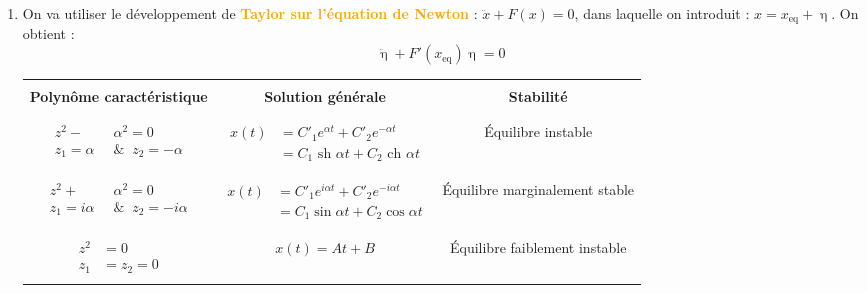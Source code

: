 \documentclass[a4paper]{article}
\begin{document}
\begin{enumerate}
\item On va utiliser le développement de \textcolor{orange}{\textbf{Taylor sur l'équation de Newton}} : $ \ddot{x} + F(x) = 0 $, dans laquelle on introduit : $ x = x_{\text{eq}} + \upeta $. On obtient : \[ \ddot{\upeta} + F'(x_{\text{eq}}) \upeta = 0 \]

\begin{center} \begin{tabular}{|c|c|c|}
\hline &&\\
\textbf{Polynôme caractéristique} & \textbf{Solution générale} & \textbf{Stabilité} \\ && \\
\hline && \\
$ \begin{aligned} z^2 - &\alpha^2 = 0 \\ z_1 = \alpha \; \; &\& \; \; z_2 = - \alpha \end{aligned} $ & $ \begin{aligned} x(t) &= C'_1 e^{\alpha t} + C'_2 e^{- \alpha t} \\ &= C_1 \text{ sh } \alpha t + C_2 \text{ ch } \alpha t \end{aligned} $ & Équilibre instable \\&& \\\hline&& \\
$ \begin{aligned} z^2 + &\alpha^2 = 0 \\ z_1 = i \alpha \; \; &\& \; \; z_2 = - i \alpha \end{aligned} $ & $ \begin{aligned} x(t) &= C'_1 e^{i \alpha t} + C'_2 e^{- i \alpha t} \\ &= C_1 \sin \alpha t + C_2 \cos \alpha t \end{aligned} $ & Équilibre marginalement stable \\&& \\\hline&& \\
$ \begin{aligned} z^2 &= 0 \\ z_1 &= z_2 = 0 \end{aligned} $ & $ x(t) = A t + B $ & Équilibre faiblement instable \\ && \\
\hline
\end{tabular} \end{center}

\end{enumerate}
\end{document}
